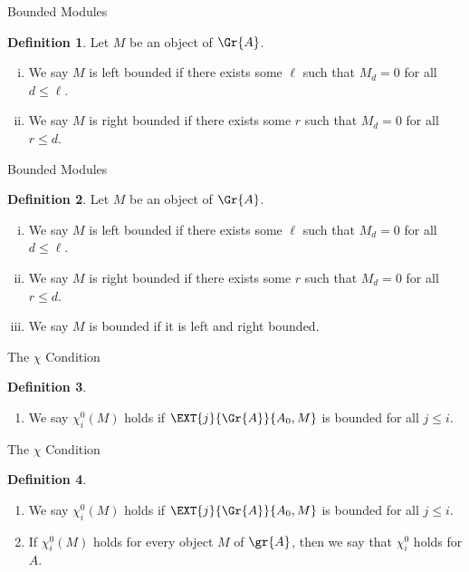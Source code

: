 \documentclass{beamer}
\theoremstyle{definition}
\newtheorem{defn}{Definition}
\begin{document}
\begin{frame}{Bounded Modules}
  \setcounter{defn}{5}
  \begin{defn}
    Let $M$ be an object of $\Gr{A}$.
    \begin{enumerate}[(i)]
    \item
      We say $M$ is left bounded if there exists some $\ell$ such that $M_d = 0$ for all $d \leq \ell$.
    \item
      We say $M$ is right bounded if there exists some $r$ such that $M_d = 0$ for all $r \leq d$.
    \end{enumerate}
  \end{defn}
\end{frame}

\begin{frame}{Bounded Modules}
  \setcounter{defn}{5}
  \begin{defn}
    Let $M$ be an object of $\Gr{A}$.
    \begin{enumerate}[(i)]
    \item
      We say $M$ is left bounded if there exists some $\ell$ such that $M_d = 0$ for all $d \leq \ell$.
      \item
        We say $M$ is right bounded if there exists some $r$ such that $M_d = 0$ for all $r \leq d$.
      \item
        We say $M$ is bounded if it is left and right bounded.
    \end{enumerate}
  \end{defn}
\end{frame}

\begin{frame}{The $\chi$ Condition}
  \begin{defn}
    \begin{enumerate}
    \item
      We say $\chi_i^0(M)$ holds if $\EXT{j}{\Gr{A}}{A_0, M}$ is bounded for all $j \leq i$.
    \end{enumerate}
  \end{defn}
\end{frame}

\begin{frame}{The $\chi$ Condition}
  \setcounter{defn}{6}
  \begin{defn}
    \begin{enumerate}
    \item
      We say $\chi_i^0(M)$ holds if $\EXT{j}{\Gr{A}}{A_0, M}$ is bounded for all $j \leq i$.
    \item
      If $\chi^0_i(M)$ holds for every object $M$ of $\gr{A}$, then we say that $\chi^0_i$ holds for $A$.
    \end{enumerate}
  \end{defn}
\end{frame}
\end{document}
